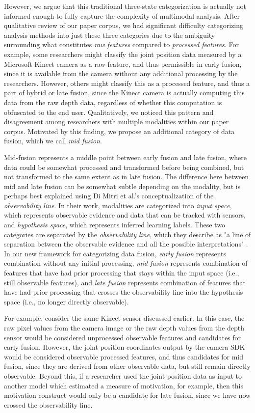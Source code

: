 \documentclass[manuscript,screen,review]{acmart}
\begin{document}
However, we argue that this traditional three-state categorization is actually not informed enough to fully capture the complexity of multimodal analysis. After qualitative review of our paper corpus, we had significant difficulty categorizing analysis methods into just these three categories due to the ambiguity surrounding what constitutes \textit{raw features} compared to \textit{processed features}. For example, some researchers might classify the joint position data measured by a Microsoft Kinect camera as a raw feature, and thus permissible in early fusion, since it is available from the camera without any additional processing by the researchers. However, others might classify this as a processed feature, and thus a part of hybrid or late fusion, since the Kinect camera is actually computing this data from the raw depth data, regardless of whether this computation is obfuscated to the end user. Qualitatively, we noticed this pattern and disagreement among researchers with multiple modalities within our paper corpus. Motivated by this finding, we propose an additional category of data fusion, which we call \textit{mid fusion}. 

Mid-fusion represents a middle point between early fusion and late fusion, where data could be somewhat processed and transformed before being combined, but not transformed to the same extent as in late fusion. The difference here between mid and late fusion can be somewhat subtle depending on the modality, but is perhaps best explained using Di Mitri et al.’s \cite{DiMitri2018} conceptualization of the \textit{observability line}. In their work, modalities are categorized into \textit{input space}, which represents observable evidence and data that can be tracked with sensors, and \textit{hypothesis space}, which represents inferred learning labels. These two categories are separated by the \textit{observability line}, which they describe as "a line of separation between the observable evidence and all the possible interpretations" \cite{DiMitri2018}. In our new framework for categorizing data fusion, \textit{early fusion} represents combination without any initial processing, \textit{mid fusion} represents combination of features that have had prior processing that stays within the input space (i.e., still observable features), and \textit{late fusion} represents combination of features that have had prior processing that crosses the observability line into the hypothesis space (i.e., no longer directly observable).

For example, consider the same Kinect sensor discussed earlier. In this case, the raw pixel values from the camera image or the raw depth values from the depth sensor would be considered unprocessed observable features and candidates for early fusion. However, the joint position coordinates output by the camera SDK would be considered observable processed features, and thus candidates for mid fusion, since they are derived from other observable data, but still remain directly observable. Beyond this, if a researcher used the joint position data as input to another model which estimated a measure of motivation, for example, then this motivation construct would only be a candidate for late fusion, since we have now crossed the observability line. 
\end{document}
